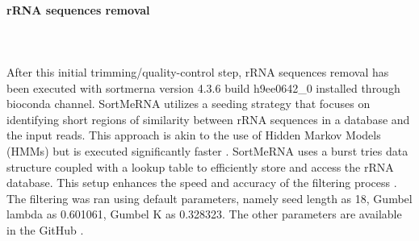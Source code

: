 \documentclass[12pt]{article}
\begin{document}
\paragraph{rRNA sequences removal}\hspace{0pt}\\\\
After this initial trimming/quality-control step, rRNA sequences removal has been executed with sortmerna version 4.3.6 build h9ee0642\_0 installed through bioconda channel. SortMeRNA utilizes a seeding strategy that focuses on identifying short regions of similarity between rRNA sequences in a database and the input reads. This approach is akin to the use of Hidden Markov Models (HMMs) but is executed significantly faster \supercite{kopylova2012sortmerna}. SortMeRNA uses a burst tries data structure coupled with a lookup table to efficiently store and access the rRNA database. This setup enhances the speed and accuracy of the filtering process \supercite{kopylova2012sortmerna}. The filtering was ran using default parameters, namely seed length as 18, Gumbel lambda as 0.601061, Gumbel K as 0.328323. The other parameters are available in the GitHub \supercite{github}. 
\end{document}
